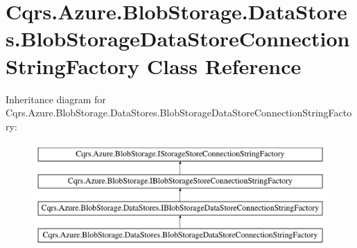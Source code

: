 \hypertarget{classCqrs_1_1Azure_1_1BlobStorage_1_1DataStores_1_1BlobStorageDataStoreConnectionStringFactory}{}\section{Cqrs.\+Azure.\+Blob\+Storage.\+Data\+Stores.\+Blob\+Storage\+Data\+Store\+Connection\+String\+Factory Class Reference}
\label{classCqrs_1_1Azure_1_1BlobStorage_1_1DataStores_1_1BlobStorageDataStoreConnectionStringFactory}
Inheritance diagram for Cqrs.\+Azure.\+Blob\+Storage.\+Data\+Stores.\+Blob\+Storage\+Data\+Store\+Connection\+String\+Factory\+:\begin{figure}[H]
\begin{center}
\leavevmode
\includegraphics[height=4.000000cm]{classCqrs_1_1Azure_1_1BlobStorage_1_1DataStores_1_1BlobStorageDataStoreConnectionStringFactory}
\end{center}
\end{figure}

